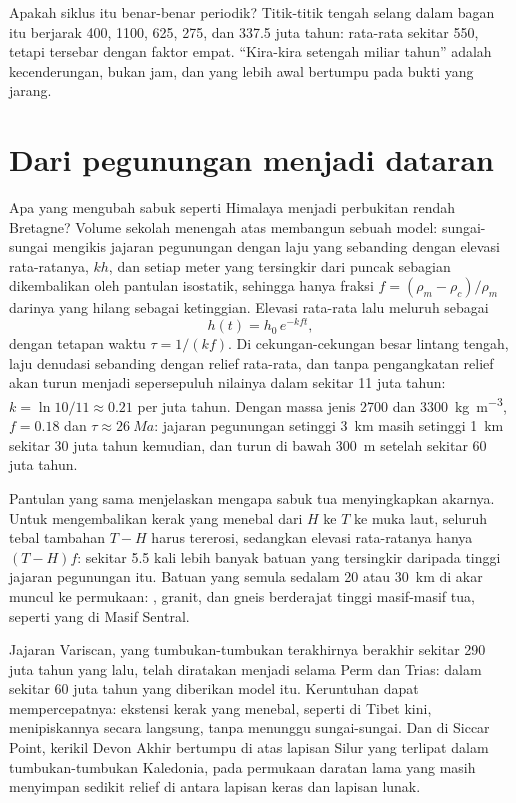 Apakah siklus itu benar-benar periodik? Titik-titik tengah selang dalam bagan itu berjarak 400,
1100, 625, 275, dan 337.5 juta tahun: rata-rata sekitar 550, tetapi tersebar dengan faktor
empat. ``Kira-kira setengah miliar tahun'' adalah kecenderungan, bukan jam, dan 
yang lebih awal bertumpu pada bukti yang jarang.

\section{Dari pegunungan menjadi dataran}\label{sec:b2:wilson-cycle:erosion}

Apa yang mengubah sabuk seperti Himalaya menjadi perbukitan rendah Bretagne? Volume sekolah menengah atas
membangun sebuah model: sungai-sungai mengikis jajaran pegunungan dengan laju yang sebanding dengan elevasi rata-ratanya, $kh$,
dan setiap meter yang tersingkir dari puncak sebagian dikembalikan oleh pantulan isostatik, sehingga hanya
fraksi $f = (\rho_m - \rho_c)/\rho_m$ darinya yang hilang sebagai ketinggian. Elevasi rata-rata lalu
meluruh sebagai
\[
  h(t) = h_0\,e^{-k f t} ,
\]
dengan tetapan waktu $\tau = 1/(kf)$. Di cekungan-cekungan besar lintang tengah, laju denudasi
sebanding dengan relief rata-rata, dan tanpa pengangkatan relief akan turun menjadi sepersepuluh
nilainya dalam sekitar 11 juta tahun: $k = \ln 10/11 \approx 0.21$ per juta tahun. Dengan
massa jenis 2700 dan \qty{3300}{kg.m^{-3}}, $f = 0.18$ dan $\tau \approx \qty{26}{Ma}$: jajaran
pegunungan setinggi \qty{3}{km} masih setinggi \qty{1}{km} sekitar 30 juta tahun kemudian, dan turun
di bawah \qty{300}{m} setelah sekitar 60 juta tahun.

Pantulan yang sama menjelaskan mengapa sabuk tua menyingkapkan akarnya. Untuk mengembalikan kerak yang menebal dari
$H$ ke $T$ ke muka laut, seluruh tebal tambahan $T - H$ harus tererosi, sedangkan elevasi
rata-ratanya hanya $(T - H)f$: sekitar 5.5 kali lebih banyak batuan yang tersingkir daripada tinggi
jajaran pegunungan itu. Batuan yang semula sedalam 20 atau \qty{30}{km} di akar muncul ke permukaan:
, granit, dan gneis berderajat tinggi masif-masif tua, seperti yang di Masif
Sentral.

Jajaran Variscan, yang tumbukan-tumbukan terakhirnya berakhir sekitar 290 juta tahun yang lalu, telah
diratakan menjadi  selama Perm dan Trias: dalam sekitar 60 juta tahun
yang diberikan model itu. Keruntuhan dapat mempercepatnya: ekstensi kerak yang menebal, seperti di
Tibet kini, menipiskannya secara langsung, tanpa menunggu sungai-sungai. Dan di Siccar Point, kerikil Devon Akhir bertumpu di atas
lapisan Silur yang terlipat dalam tumbukan-tumbukan Kaledonia, pada permukaan daratan lama yang masih menyimpan
sedikit relief di antara lapisan keras dan lapisan lunak.

